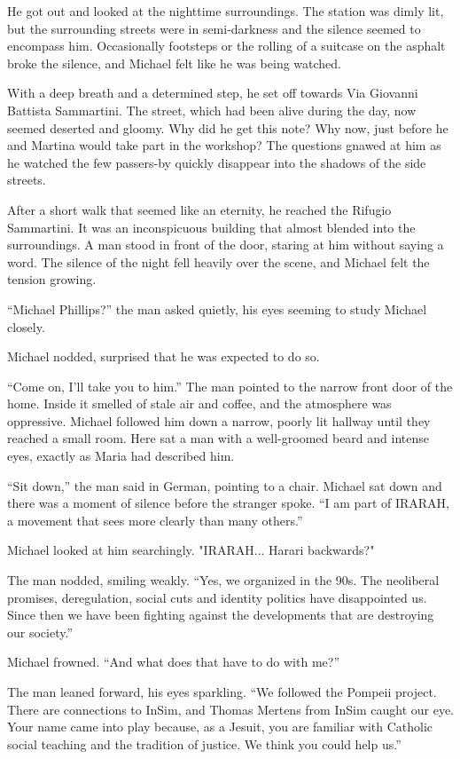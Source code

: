 \documentclass[
]{article}
\begin{document}
He got out and looked at the nighttime surroundings. The station was
dimly lit, but the surrounding streets were in semi-darkness and the
silence seemed to encompass him. Occasionally footsteps or the rolling
of a suitcase on the asphalt broke the silence, and Michael felt like he
was being watched.

With a deep breath and a determined step, he set off towards Via
Giovanni Battista Sammartini. The street, which had been alive during
the day, now seemed deserted and gloomy. Why did he get this note? Why
now, just before he and Martina would take part in the workshop? The
questions gnawed at him as he watched the few passers-by quickly
disappear into the shadows of the side streets.

After a short walk that seemed like an eternity, he reached the Rifugio
Sammartini. It was an inconspicuous building that almost blended into
the surroundings. A man stood in front of the door, staring at him
without saying a word. The silence of the night fell heavily over the
scene, and Michael felt the tension growing.

``Michael Phillips?'' the man asked quietly, his eyes seeming to study
Michael closely.

Michael nodded, surprised that he was expected to do so.

``Come on, I'll take you to him.'' The man pointed to the narrow front
door of the home. Inside it smelled of stale air and coffee, and the
atmosphere was oppressive. Michael followed him down a narrow, poorly
lit hallway until they reached a small room. Here sat a man with a
well-groomed beard and intense eyes, exactly as Maria had described him.

``Sit down,'' the man said in German, pointing to a chair. Michael sat
down and there was a moment of silence before the stranger spoke. ``I am
part of IRARAH, a movement that sees more clearly than many others.''

Michael looked at him searchingly. "IRARAH... Harari backwards?"

The man nodded, smiling weakly. ``Yes, we organized in the 90s. The
neoliberal promises, deregulation, social cuts and identity politics
have disappointed us. Since then we have been fighting against the
developments that are destroying our society.''

Michael frowned. ``And what does that have to do with me?''

The man leaned forward, his eyes sparkling. ``We followed the Pompeii
project. There are connections to InSim, and Thomas Mertens from InSim
caught our eye. Your name came into play because, as a Jesuit, you are
familiar with Catholic social teaching and the tradition of justice. We
think you could help us.''
\end{document}
